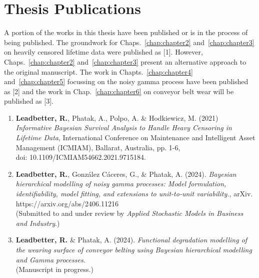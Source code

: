 
\chapter*{Thesis Publications}  \label{chap:publications}

A portion of the works in this thesis have been published or is in the process of being published. The groundwork for Chaps.~\ref{chap:chapter2} and~\ref{chap:chapter3} on heavily censored lifetime data were published as \citet{leadbetter2021}[1]. However, Chaps.~\ref{chap:chapter2} and~\ref{chap:chapter3} present an alternative approach to the original manuscript. The work in Chapts.~\ref{chap:chapter4} and~\ref{chap:chapter5} focussing on the noisy gamma process have been published as \citet{leadbetter2024}[2] and the work in Chap.~\ref{chap:chapter6} on conveyor belt wear will be published as \citet{leadbetter2025}[3].

\begin{enumerate}
  \item \textbf{Leadbetter, R.}, Phatak, A., Polpo, A. \& Hodkiewicz, M. (2021) \textit{Informative Bayesian Survival Analysis to Handle Heavy Censoring in Lifetime Data}, International Conference on Maintenance and Intelligent Asset Management (ICMIAM), Ballarat, Australia, pp. 1-6,\\ doi: 10.1109/ICMIAM54662.2021.9715184.
  \item \textbf{Leadbetter, R.}, Gonz\'{a}lez C\'{a}ceres, G., \& Phatak, A. (2024). \textit{Bayesian hierarchical modelling of noisy gamma processes: Model formulation, identifiability, model fitting, and extensions to unit-to-unit variability.}, arXiv. https://arxiv.org/abs/2406.11216 \\
  (Submitted to and under review by \textit{Applied Stochastic Models in Business and Industry}.)
  \item \textbf{Leadbetter, R.} \& Phatak, A. (2024). \textit{Functional degradation modelling of the wearing surface of conveyor belting using Bayesian hierarchical modelling and Gamma processes.} \\
  (Manuscript in progress.)
\end{enumerate}